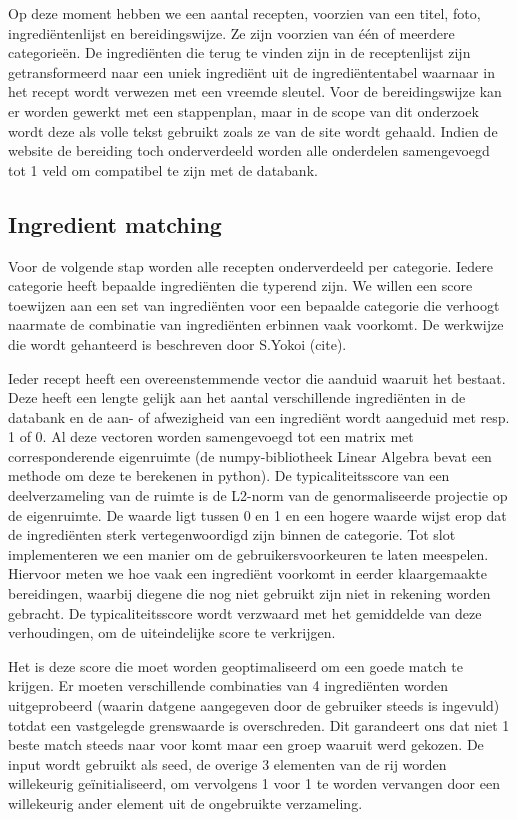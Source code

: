 \documentclass{hogent-article}
\begin{document}
Op deze moment hebben we een aantal recepten, voorzien van een titel, foto, ingrediëntenlijst en bereidingswijze. Ze zijn voorzien van één of meerdere categorieën. De ingrediënten die terug te vinden zijn in de receptenlijst zijn getransformeerd naar een uniek ingrediënt uit de ingrediëntentabel waarnaar in het recept wordt verwezen met een vreemde sleutel. Voor de bereidingswijze kan er worden gewerkt met een stappenplan, maar in de scope van dit onderzoek wordt deze als volle tekst gebruikt zoals ze van de site wordt gehaald. Indien de website de bereiding toch onderverdeeld worden alle onderdelen samengevoegd tot 1 veld om compatibel te zijn met de databank.

\subsection{Ingredient matching}%

Voor de volgende stap worden alle recepten onderverdeeld per categorie. Iedere categorie heeft bepaalde ingrediënten die typerend zijn. We willen een score toewijzen aan een set van ingrediënten voor een bepaalde categorie die verhoogt naarmate de combinatie van ingrediënten erbinnen vaak voorkomt. De werkwijze die wordt gehanteerd is beschreven door S.Yokoi (cite).

Ieder recept heeft een overeenstemmende vector die aanduid waaruit het bestaat. Deze heeft een lengte gelijk aan het aantal verschillende ingrediënten in de databank en de aan- of afwezigheid van een ingrediënt wordt aangeduid met resp. 1 of 0. Al deze vectoren worden samengevoegd tot een matrix met  corresponderende eigenruimte (de numpy-bibliotheek Linear Algebra bevat een methode om deze te berekenen in python). De typicaliteitsscore van een deelverzameling van de ruimte is de L2-norm van de genormaliseerde projectie op de eigenruimte. De waarde ligt tussen 0 en 1 en een hogere waarde wijst erop dat de ingrediënten sterk vertegenwoordigd zijn binnen de categorie. Tot slot implementeren we een manier om de gebruikersvoorkeuren te laten meespelen. Hiervoor meten we hoe vaak een ingrediënt voorkomt in eerder klaargemaakte bereidingen, waarbij diegene die nog niet gebruikt zijn niet in rekening worden gebracht. De typicaliteitsscore wordt verzwaard met het gemiddelde van deze verhoudingen, om de uiteindelijke score te verkrijgen.

Het is deze score die moet worden geoptimaliseerd om een goede match te krijgen. Er moeten verschillende combinaties van 4 ingrediënten worden uitgeprobeerd (waarin datgene aangegeven door de gebruiker steeds is ingevuld) totdat een vastgelegde grenswaarde is overschreden. Dit garandeert ons dat niet 1 beste match steeds naar voor komt maar een groep waaruit werd gekozen. De input wordt gebruikt als seed, de overige 3 elementen van de rij worden willekeurig geïnitialiseerd, om vervolgens 1 voor 1 te worden vervangen door een willekeurig ander element uit de ongebruikte verzameling. 
\end{document}
